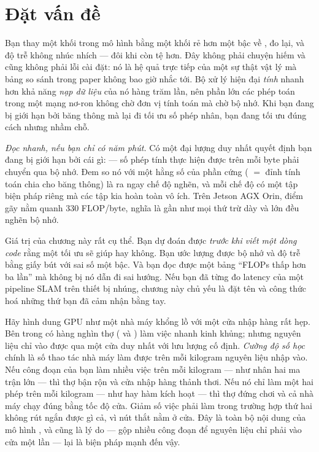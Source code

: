 \documentclass[../../deep_learning.tex]{subfiles}
\begin{document}
\section{Đặt vấn đề}

Bạn thay một khối trong mô hình bằng một khối rẻ hơn một bậc về , đo lại, và độ trễ không nhúc nhích --- đôi khi còn tệ hơn. Đây không phải chuyện hiếm và cũng không phải lỗi cài đặt: nó là hệ quả trực tiếp của một sự thật vật lý mà bảng so sánh trong paper không bao giờ nhắc tới. Bộ xử lý hiện đại \emph{tính} nhanh hơn khả năng \emph{nạp dữ liệu} của nó hàng trăm lần, nên phần lớn các phép toán trong một mạng nơ-ron không chờ đơn vị tính toán mà chờ bộ nhớ. Khi bạn đang bị giới hạn bởi băng thông mà lại đi tối ưu số phép nhân, bạn đang tối ưu đúng cách nhưng nhầm chỗ.

\emph{Đọc nhanh, nếu bạn chỉ có năm phút.} Có một đại lượng duy nhất quyết định bạn đang bị giới hạn bởi cái gì:  --- số phép tính thực hiện được trên mỗi byte phải chuyển qua bộ nhớ. Đem so nó với một hằng số của phần cứng ( \(=\) đỉnh tính toán chia cho băng thông) là ra ngay chế độ nghẽn, và mỗi chế độ có một tập biện pháp riêng mà các tập kia hoàn toàn vô ích. Trên Jetson AGX Orin, điểm gãy nằm quanh 330 FLOP/byte, nghĩa là gần như mọi thứ trừ  dày và  lớn đều nghẽn bộ nhớ.

Giá trị của chương này rất cụ thể. Bạn dự đoán được \emph{trước khi viết một dòng code} rằng một tối ưu sẽ giúp hay không. Bạn ước lượng được bộ nhớ và độ trễ bằng giấy bút với sai số một bậc. Và bạn đọc được một bảng ``FLOPs thấp hơn ba lần'' mà không bị nó dẫn đi sai hướng. Nếu bạn đã từng đo latency của một pipeline SLAM trên thiết bị nhúng, chương này chủ yếu là đặt tên và công thức hoá những thứ bạn đã cảm nhận bằng tay.

\begin{trucgiac}
Hãy hình dung GPU như một nhà máy khổng lồ với một cửa nhập hàng rất hẹp. Bên trong có hàng nghìn thợ ( và ) làm việc nhanh kinh khủng; nhưng nguyên liệu chỉ vào được qua một cửa duy nhất với lưu lượng cố định. \emph{Cường độ số học} chính là số thao tác nhà máy làm được trên mỗi kilogram nguyên liệu nhập vào. Nếu công đoạn của bạn làm nhiều việc trên mỗi kilogram --- như nhân hai ma trận lớn --- thì thợ bận rộn và cửa nhập hàng thảnh thơi. Nếu nó chỉ làm một hai phép trên mỗi kilogram --- như  hay hàm kích hoạt --- thì thợ đứng chơi và cả nhà máy chạy đúng bằng tốc độ cửa. Giảm số việc phải làm trong trường hợp thứ hai không rút ngắn được gì cả, vì nút thắt nằm ở cửa. Đây là toàn bộ nội dung của mô hình , và cũng là lý do  --- gộp nhiều công đoạn để nguyên liệu chỉ phải vào cửa một lần --- lại là biện pháp mạnh đến vậy.
\end{trucgiac}
\end{document}
